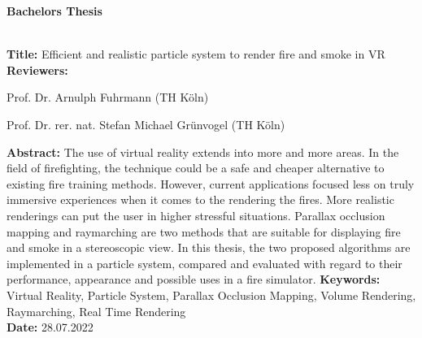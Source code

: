 \begin{flushleft}
	\begin{huge}
		\textbf{Bachelors Thesis}
	\end{huge}
	~\\
	\textbf{Title:} Efficient and realistic particle system to render fire and smoke in VR
	~\\
	\doublespacing
	\textbf{Reviewers:}
	\begin{description}
		\vspace{-0.2cm}
		\itemsep-8pt
		\item[–]
			Prof. Dr. Arnulph Fuhrmann (TH Köln)
		\item[–]
			Prof. Dr. rer. nat. Stefan Michael Grünvogel (TH Köln)
	\end{description}
	\vspace{-0.4cm}
	\singlespacing
	\textbf{Abstract:}
	The use of virtual reality extends into more and more areas.
	In the field of firefighting, the technique could be a safe and cheaper
	alternative to existing fire training methods.
	However, current applications focused less on truly immersive experiences when it
	comes to the rendering the fires. More realistic renderings can put the user in higher
	stressful situations.
	Parallax occlusion mapping and raymarching are two methods that are suitable
	for displaying fire and smoke in a stereoscopic view.
	In this thesis, the two proposed algorithms are implemented in a particle system, compared and
	evaluated with regard to their performance, appearance and possible uses in a fire simulator.
	\singlespacing
	\textbf{Keywords:} Virtual Reality, Particle System, Parallax Occlusion Mapping, Volume Rendering, Raymarching, Real Time Rendering\\
	\doublespacing
	\textbf{Date:} 28.07.2022
\end{flushleft}

